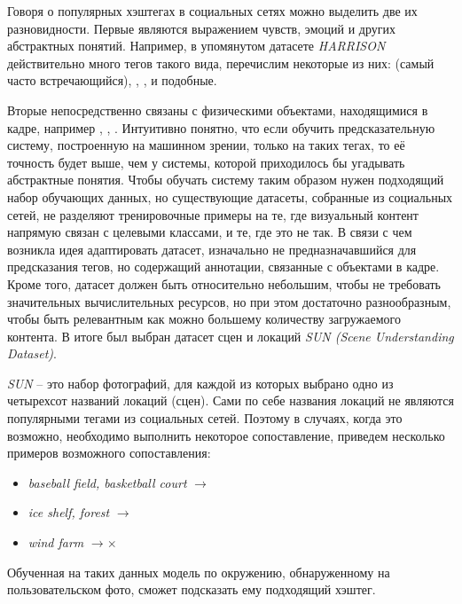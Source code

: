 \indent
\indent
Говоря о популярных хэштегах в социальных сетях можно выделить две 
их разновидности.
Первые являются выражением чувств, эмоций и других абстрактных понятий.
Например, в упомянутом датасете \textit{HARRISON} 
действительно много тегов такого вида, перечислим некоторые из них: 
 (самый часто встречающийся), , ,
 и подобные.


\indent
\indent
Вторые непосредственно
связаны с физическими объектами, находящимися в кадре, например  
, , . 
Интуитивно понятно, что если обучить предсказательную систему,
построенную на машинном зрении, только на таких тегах, то
её точность будет выше, чем у системы, которой приходилось бы угадывать
абстрактные понятия. Чтобы обучать систему таким образом
нужен подходящий набор обучающих данных, но существующие датасеты, 
собранные из социальных сетей, не разделяют тренировочные примеры на те, 
где визуальный контент напрямую связан с целевыми классами, и те, где это не так.
В связи с чем возникла идея 
адаптировать датасет, изначально не предназначавшийся для предсказания
тегов, но содержащий аннотации, связанные с объектами
в кадре. Кроме того, датасет должен быть относительно небольшим,
чтобы не требовать значительных 
вычислительных ресурсов, но при этом достаточно разнообразным, чтобы 
быть релевантным как можно большему количеству загружаемого контента.
В итоге был выбран датасет сцен и локаций 
\textit{SUN\cite{sundata} (Scene Understanding Dataset)}.


\indent
\indent  
\textit{SUN} -- это набор фотографий, для каждой из которых выбрано одно
из четырехсот названий локаций (сцен). Сами по себе названия локаций
не являются популярными 
тегами из социальных сетей. Поэтому в случаях, когда это возможно, необходимо
выполнить некоторое сопоставление, приведем несколько примеров возможного
сопоставления:


  \begin{itemize}
      \item \textit{baseball field, basketball court}  $\rightarrow$ 
      \item \textit{ice shelf, forest} $\rightarrow$ 
      \item \textit{wind farm} $\rightarrow \times$ 
  \end{itemize}
  
  
\indent
\indent
Обученная на таких данных модель по окружению,
обнаруженному на пользовательском фото,
сможет подсказать ему подходящий хэштег.



